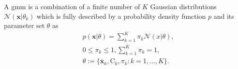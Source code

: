 \documentclass[../../../main.tex]{subfiles}
\begin{document}
\begin{definition}\label{def:gmm} \cite[p. 315]{dei_2020}
A \acrlong{gmm} is a combination of a finite number of $K$ Gaussian distributions $\mathcal{N}(\bm{x}|\theta_k)$ which is fully described by a probability density function $p$ and its parameter set $\theta$ as
\begin{equation}\label{eq:gmm_def}
    \begin{aligned}
        &p(\bm{x}|\theta) = \sum\limits_{k=1}^K \pi_k \mathcal{N}(x | \theta), \\
        &0 \leq \pi_k \leq 1, \sum\limits_{k=1}^K \pi_k = 1, \\
        &\theta := \{\overline{\bm{x}}_k, \bm{\mathrm{C}}_k, \pi_k : k = 1, \dots, K \}.
    \end{aligned}
\end{equation}
\end{definition}



\end{document}
